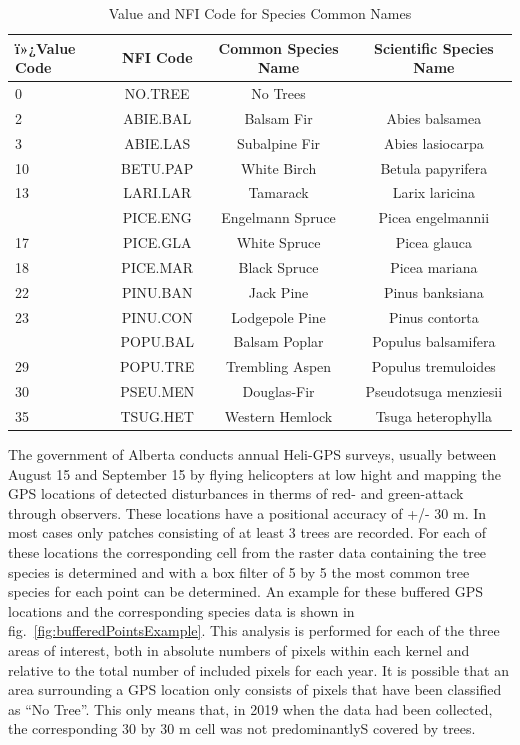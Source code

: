 \documentclass[
]{article}
\begin{document}
\begin{table}

\caption{\label{tab:species}Value and NFI Code for Species Common Names}
\centering
\begin{tabular}[t]{lccc}
\toprule
ï»¿Value Code & NFI Code & Common Species Name & Scientific Species Name\\
\midrule
0 & NO.TREE & No Trees & \\
2 & ABIE.BAL & Balsam Fir & Abies balsamea\\
3 & ABIE.LAS & Subalpine Fir & Abies lasiocarpa\\
10 & BETU.PAP & White Birch & Betula papyrifera\\
13 & LARI.LAR & Tamarack & Larix laricina\\
\addlinespace
16 & PICE.ENG & Engelmann Spruce & Picea engelmannii\\
17 & PICE.GLA & White Spruce & Picea glauca\\
18 & PICE.MAR & Black Spruce & Picea mariana\\
22 & PINU.BAN & Jack Pine & Pinus banksiana\\
23 & PINU.CON & Lodgepole Pine & Pinus contorta\\
\addlinespace
27 & POPU.BAL & Balsam Poplar & Populus balsamifera\\
29 & POPU.TRE & Trembling Aspen & Populus tremuloides\\
30 & PSEU.MEN & Douglas-Fir & Pseudotsuga menziesii\\
35 & TSUG.HET & Western Hemlock & Tsuga heterophylla\\
\bottomrule
\end{tabular}
\end{table}

The government of Alberta conducts annual Heli-GPS surveys, usually between August 15 and September 15 by flying helicopters at low hight and mapping the GPS locations of detected disturbances in therms of red- and green-attack through observers. These locations have a positional accuracy of +/- 30 m. In most cases only patches consisting of at least 3 trees are recorded. For each of these locations the corresponding cell from the raster data containing the tree species is determined and with a box filter of 5 by 5 the most common tree species for each point can be determined. An example for these buffered GPS locations and the corresponding species data is shown in fig.~\ref{fig:bufferedPointsExample}. This analysis is performed for each of the three areas of interest, both in absolute numbers of pixels within each kernel and relative to the total number of included pixels for each year. It is possible that an area surrounding a GPS location only consists of pixels that have been classified as ``No Tree''. This only means that, in 2019 when the data had been collected, the corresponding 30 by 30 m cell was not predominantlyS covered by trees.
\end{document}
